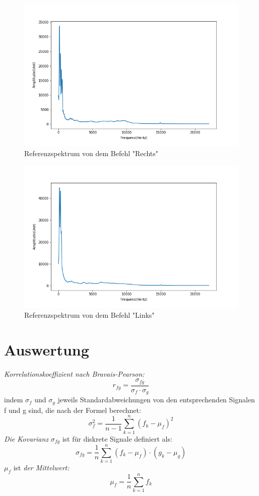 \documentclass[12pt, oneside, a4paper, \docLanguage]{report}
\begin{document}
\begin{figure}[H]
	\centering\small
	\includegraphics[width=12cm]{spektrum_mittel_windowsrechts.png}
	\caption{Referenzspektrum von dem Befehl "Rechts"}
\end{figure}

\begin{figure}[H]
	\centering\small
	\includegraphics[width=12cm]{spektrum_mittel_windowslinks.png}
	\caption{Referenzspektrum von dem Befehl "Links"}
\end{figure}
\section{Auswertung}

\label{chap:VERSUCH_2_AUSWERTUNG}

\textit{Korrelationskoeffizient nach Bravais-Pearson:} $$r_{fg}=\frac{\sigma_{fg}}{\sigma_{f}\cdot\sigma_{g}}$$ indem $\sigma_{f}$ und $\sigma_{g}$ jeweils Standardabweichungen von den entsprechenden Signalen f und g sind, die nach der Formel berechnet: $$\sigma^2_f=\frac{1}{n-1}\sum_{k=1}^{n}(f_k-\mu_f)^2$$
\qquad\textit{Die Kovarianz} $\sigma_{fg}$ ist für diskrete Signale definiert als:$$\sigma_{fg}=\frac{1}{n}\sum_{k=1}^{n}(f_k-\mu_f)\cdot(g_k-\mu_g)$$
\qquad $\mu_f$ ist \textit{der Mittelwert:} $$\mu_f=\frac{1}{n}\sum_{k=1}^nf_k$$
\end{document}
